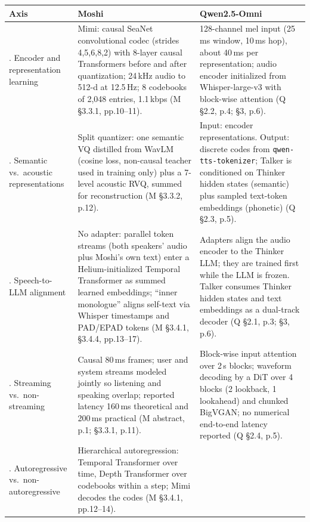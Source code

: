 \documentclass[11pt,a4paper,twocolumn]{article}
\renewcommand{\arraystretch}{1.08}
\newcommand{\M}{\textsc{M}}
\newcommand{\Q}{\textsc{Q}}
\begin{document}
\begin{table}[t]
\centering\footnotesize
\renewcommand{\arraystretch}{1.18}
\begin{tabular}{@{}>{\raggedright\arraybackslash}p{2.3cm}p{6.7cm}p{6.7cm}@{}}
\toprule
\textbf{Axis} & \textbf{Moshi} \citep{moshi} & \textbf{Qwen2.5-Omni} \citep{qwenomni} \\
\midrule
1. Encoder and representation learning &
Mimi: causal SeaNet convolutional codec (strides 4,5,6,8,2) with 8-layer causal Transformers before and after quantization; 24\,kHz audio to 512-d at 12.5\,Hz; 8 codebooks of 2{,}048 entries, 1.1\,kbps (\M{} \S3.3.1, pp.10--11). &
128-channel mel input (25\,ms window, 10\,ms hop), about 40\,ms per representation; audio encoder initialized from Whisper-large-v3 with block-wise attention (\Q{} \S2.2, p.4; \S3, p.6). \\
2. Semantic vs.\ acoustic representations &
Split quantizer: one semantic VQ distilled from WavLM (cosine loss, non-causal teacher used in training only) plus a 7-level acoustic RVQ, summed for reconstruction (\M{} \S3.3.2, p.12). &
Input: encoder representations. Output: discrete codes from \texttt{qwen-tts-tokenizer}; Talker is conditioned on Thinker hidden states (semantic) plus sampled text-token embeddings (phonetic) (\Q{} \S2.3, p.5). \\
3. Speech-to-LLM alignment &
No adapter: parallel token streams (both speakers' audio plus Moshi's own text) enter a Helium-initialized Temporal Transformer as summed learned embeddings; ``inner monologue'' aligns self-text via Whisper timestamps and PAD/EPAD tokens (\M{} \S3.4.1, \S3.4.4, pp.13--17). &
Adapters align the audio encoder to the Thinker LLM; they are trained first while the LLM is frozen. Talker consumes Thinker hidden states and text embeddings as a dual-track decoder (\Q{} \S2.1, p.3; \S3, p.6). \\
4. Streaming vs.\ non-streaming &
Causal 80\,ms frames; user and system streams modeled jointly so listening and speaking overlap; reported latency 160\,ms theoretical and 200\,ms practical (\M{} abstract, p.1; \S3.3.1, p.11). &
Block-wise input attention over 2\,s blocks; waveform decoding by a DiT over 4 blocks (2 lookback, 1 lookahead) and chunked BigVGAN; no numerical end-to-end latency reported (\Q{} \S2.4, p.5). \\
5. Autoregressive vs.\ non-autoregressive &
Hierarchical autoregression: Temporal Transformer over time, Depth Transformer over codebooks within a step; Mimi decodes the codes (\M{} \S3.4.1, pp.12--14). &

\end{tabular}
\end{table}
\end{document}
